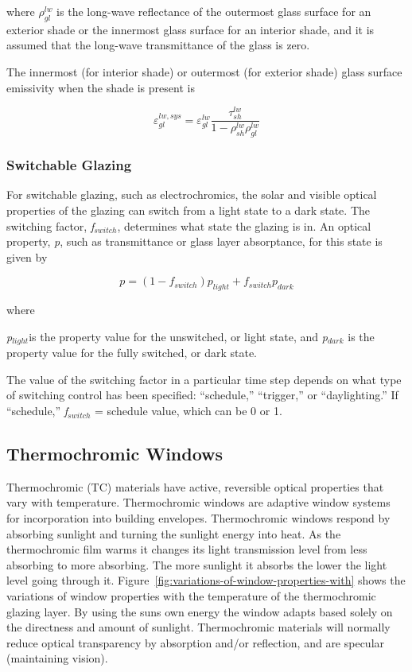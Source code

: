 where \(\rho_{gl}^{lw}\) is the long-wave reflectance of the outermost glass surface for an exterior shade or the innermost glass surface for an interior shade, and it is assumed that the long-wave transmittance of the glass is zero.

The innermost (for interior shade) or outermost (for exterior shade) glass surface emissivity when the shade is present is

\begin{equation}
\varepsilon_{gl}^{lw,sys} = \varepsilon_{gl}^{lw}\frac{{\tau_{sh}^{lw}}}{{1 - \rho_{sh}^{lw}\rho_{gl}^{lw}}}
\end{equation}

\subsubsection{Switchable Glazing}\label{switchable-glazing}

For switchable glazing, such as electrochromics, the solar and visible optical properties of the glazing can switch from a light state to a dark state. The switching factor, \emph{f\(_{switch}\)}, determines what state the glazing is in. An optical property, \emph{p}, such as transmittance or glass layer absorptance, for this state is given by

\begin{equation}
p = (1 - {f_{switch}}){p_{light}} + {f_{switch}}{p_{dark}}
\end{equation}

where

\emph{p\(_{light}\)}is the property value for the unswitched, or light state, and \emph{p\(_{dark}\)} is the property value for the fully switched, or dark state.

The value of the switching factor in a particular time step depends on what type of switching control has been specified: ``schedule,'' ``trigger,'' or ``daylighting.'' If ``schedule,'' \emph{f\(_{switch}\)} = schedule value, which can be 0 or 1.

\subsection{Thermochromic Windows}\label{thermochromic-windows}

Thermochromic (TC) materials have active, reversible optical properties that vary with temperature. Thermochromic windows are adaptive window systems for incorporation into building envelopes. Thermochromic windows respond by absorbing sunlight and turning the sunlight energy into heat. As the thermochromic film warms it changes its light transmission level from less absorbing to more absorbing. The more sunlight it absorbs the lower the light level going through it. Figure~\ref{fig:variations-of-window-properties-with} shows the variations of window properties with the temperature of the thermochromic glazing layer. By using the suns own energy the window adapts based solely on the directness and amount of sunlight. Thermochromic materials will normally reduce optical transparency by absorption and/or reflection, and are specular (maintaining vision).

